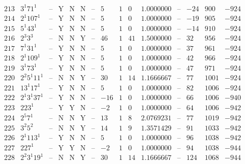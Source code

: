 \documentclass[11pt,reqno,a4letter]{article}
\numberwithin{figure}{section}
\numberwithin{table}{section}
\theoremstyle{plain}
\numberwithin{theorem}{section}
\theoremstyle{definition}
\begin{document}
\begin{table}[h!]
\begin{equation*}
{\begin{array}{|cc|c|ccc|c|c|ccc|c|ccc}
 213 & 3^1 71^1 & \text{--} & \text{Y} & \text{N} & \text{N} & \text{--} & 5 & 1 & 0 & 1.0000000 & \text{--} & -24 & 900 & -924 \\
 214 & 2^1 107^1 & \text{--} & \text{Y} & \text{N} & \text{N} & \text{--} & 5 & 1 & 0 & 1.0000000 & \text{--} & -19 & 905 & -924 \\
 215 & 5^1 43^1 & \text{--} & \text{Y} & \text{N} & \text{N} & \text{--} & 5 & 1 & 0 & 1.0000000 & \text{--} & -14 & 910 & -924 \\
 216 & 2^3 3^3 & \text{--} & \text{N} & \text{N} & \text{Y} & \text{--} & 46 & 1 & 41 & 1.5000000 & \text{--} & 32 & 956 & -924 \\
 217 & 7^1 31^1 & \text{--} & \text{Y} & \text{N} & \text{N} & \text{--} & 5 & 1 & 0 & 1.0000000 & \text{--} & 37 & 961 & -924 \\
 218 & 2^1 109^1 & \text{--} & \text{Y} & \text{N} & \text{N} & \text{--} & 5 & 1 & 0 & 1.0000000 & \text{--} & 42 & 966 & -924 \\
 219 & 3^1 73^1 & \text{--} & \text{Y} & \text{N} & \text{N} & \text{--} & 5 & 1 & 0 & 1.0000000 & \text{--} & 47 & 971 & -924 \\
 220 & 2^2 5^1 11^1 & \text{--} & \text{N} & \text{N} & \text{Y} & \text{--} & 30 & 1 & 14 & 1.1666667 & \text{--} & 77 & 1001 & -924 \\
 221 & 13^1 17^1 & \text{--} & \text{Y} & \text{N} & \text{N} & \text{--} & 5 & 1 & 0 & 1.0000000 & \text{--} & 82 & 1006 & -924 \\
 222 & 2^1 3^1 37^1 & \text{--} & \text{Y} & \text{N} & \text{N} & \text{--} & -16 & 1 & 0 & 1.0000000 & \text{--} & 66 & 1006 & -940 \\
 223 & 223^1 & \text{--} & \text{Y} & \text{Y} & \text{N} & \text{--} & -2 & 1 & 0 & 1.0000000 & \text{--} & 64 & 1006 & -942 \\
 224 & 2^5 7^1 & \text{--} & \text{N} & \text{N} & \text{Y} & \text{--} & 13 & 1 & 8 & 2.0769231 & \text{--} & 77 & 1019 & -942 \\
 225 & 3^2 5^2 & \text{--} & \text{N} & \text{N} & \text{Y} & \text{--} & 14 & 1 & 9 & 1.3571429 & \text{--} & 91 & 1033 & -942 \\
 226 & 2^1 113^1 & \text{--} & \text{Y} & \text{N} & \text{N} & \text{--} & 5 & 1 & 0 & 1.0000000 & \text{--} & 96 & 1038 & -942 \\
 227 & 227^1 & \text{--} & \text{Y} & \text{Y} & \text{N} & \text{--} & -2 & 1 & 0 & 1.0000000 & \text{--} & 94 & 1038 & -944 \\
 228 & 2^2 3^1 19^1 & \text{--} & \text{N} & \text{N} & \text{Y} & \text{--} & 30 & 1 & 14 & 1.1666667 & \text{--} & 124 & 1068 & -944 \\

\end{array}}
\end{equation*}
\end{table}
\end{document}
